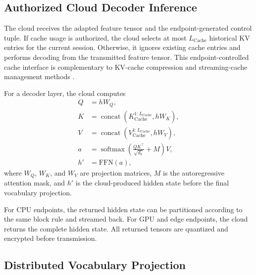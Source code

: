 \documentclass{article}
\newcommand{\Cache}{\mathrm{Cache}}
\newcommand{\softmax}{\operatorname{softmax}}
\newcommand{\concat}{\operatorname{concat}}
\begin{document}
\subsection{Authorized Cloud Decoder Inference}

The cloud receives the adapted feature tensor and the endpoint-generated control tuple. If cache usage is authorized, the cloud selects at most $L_{\Cache}$ historical KV entries for the current session. Otherwise, it ignores existing cache entries and performs decoding from the transmitted feature tensor. This endpoint-controlled cache interface is complementary to KV-cache compression and streaming-cache management methods \cite{zhang2023h2o,xiao2024streamingllm}.

For a decoder layer, the cloud computes
\begin{align}
  Q &= hW_Q, \\
  K &= \concat(K_{\Cache}^{1:L_{\Cache}}, hW_K), \\
  V &= \concat(V_{\Cache}^{1:L_{\Cache}}, hW_V), \\
  a &= \softmax\!\left(\frac{QK^\top}{\sqrt{d_k}} + M\right)V, \\
  h' &= \mathrm{FFN}(a),
\end{align}
where $W_Q$, $W_K$, and $W_V$ are projection matrices, $M$ is the autoregressive attention mask, and $h'$ is the cloud-produced hidden state before the final vocabulary projection.

For CPU endpoints, the returned hidden state can be partitioned according to the same block rule and streamed back. For GPU and edge endpoints, the cloud returns the complete hidden state. All returned tensors are quantized and encrypted before transmission.

\subsection{Distributed Vocabulary Projection}
\end{document}
